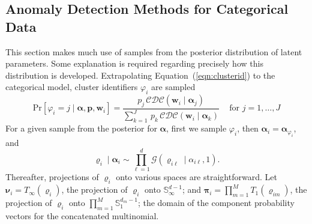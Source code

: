 \subsection{Anomaly Detection Methods for Categorical Data\label{subsec:catscores}}
This section makes much use of samples from the posterior distribution of
    latent parameters.  Some explanation is required regarding precisely how 
    this distribution is developed.  Extrapolating Equation~(\ref{eqn:clusterid})
    to the categorical model, cluster identifiers $\varphi_i$ are sampled
    \begin{equation}
        \label{eqn:latentposterior}
        \text{Pr}[\varphi_i = j\mid \bm{\alpha}, \bm{p}, \bm{w}_i] = \frac{p_j\,\mathcal{CDC}\left(\bm{w}_i\mid\bm{\alpha}_j\right)}{\sum_{k = 1}^J\,p_k\,\mathcal{CDC}\left(\bm{w}_i\mid\bm{\alpha}_k\right)}
            \;\;\;\text{ for }j = 1, \ldots, J
    \end{equation}
    For a given sample from the posterior for $\bm{\alpha}$,
    first we sample $\varphi_i$, then $\bm{\alpha}_i = \bm{\alpha}_{\varphi_i}$, and
    \begin{equation}
        \label{eqn:postpredrho}
        \bm{\varrho}_i\mid\bm{\alpha}_i \sim 
        \prod_{\ell = 1}^d\mathcal{G}\left(\varrho_{i\ell}\mid\alpha_{i\ell}, 1\right).
    \end{equation}
    Thereafter, projections of $\bm{\varrho}_i$ onto various spaces are straightforward.
    Let $\bm{\nu}_i = T_{\infty}(\bm{\varrho}_i)$, the projection of $\bm{\varrho}_i$ 
    onto $\mathbb{S}_{\infty}^{d-1}$; and 
    $\bm{\pi}_i = \prod_{m=1}^{M}T_1(\bm{\varrho}_{im})$, 
    the projection of $\bm{\varrho}_i$ onto $\prod_{m = 1}^M\mathbb{S}_1^{{d_m}-1}$; 
    the domain of the component probability vectors for the concatenated multinomial.

